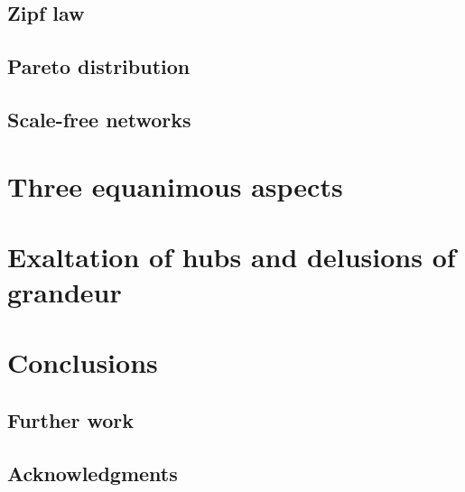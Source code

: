 \documentclass[a4paper, 11pt]{article} %
\begin{document}
\subsection{Zipf law}
\subsection{Pareto distribution}
\subsection{Scale-free networks}


\section{Three equanimous aspects}\label{sec:three}

\section{Exaltation of hubs and delusions of grandeur}\label{sec:delusion}

\section{Conclusions}\label{sec:con}
\subsection{Further work}
\subsection{Acknowledgments}

%
%



\end{document}
